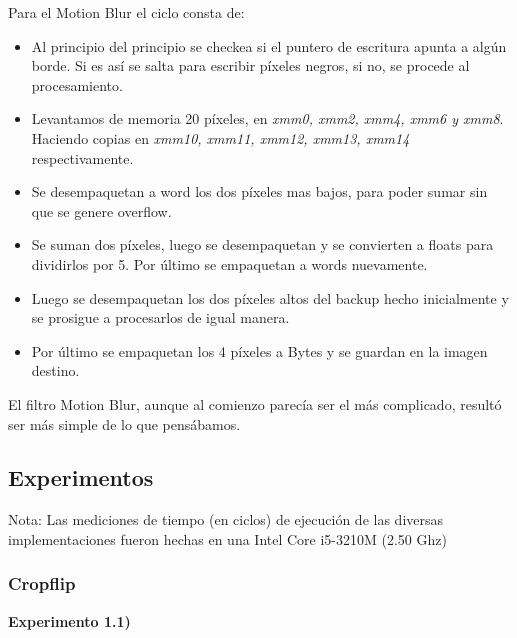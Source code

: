 \documentclass[a4paper]{article}
\begin{document}
Para el Motion Blur el ciclo consta de:
\begin{itemize}
\item Al principio del principio se checkea si el puntero de escritura apunta a alg\'{u}n borde. Si es as\'{i} se salta para escribir p\'{i}xeles negros, si no, se procede al procesamiento. \\
\item Levantamos de memoria 20 p\'{i}xeles, en \textit{xmm0, xmm2, xmm4, xmm6 y xmm8}. Haciendo copias en \textit{xmm10, xmm11, xmm12, xmm13, xmm14} respectivamente. \\
\item Se desempaquetan a word los dos p\'{i}xeles mas bajos, para poder sumar sin que se genere overflow. \\
\item Se suman dos p\'{i}xeles, luego se desempaquetan y se convierten a floats para dividirlos por 5. Por \'{u}ltimo se empaquetan a words nuevamente. \\
\item Luego se desempaquetan los dos p\'{i}xeles altos del backup hecho inicialmente y se prosigue a procesarlos de igual manera. \\
\item Por \'{u}ltimo se empaquetan los 4 p\'{i}xeles a Bytes y se guardan en la imagen destino.
\end{itemize}

El filtro Motion Blur, aunque al comienzo parecía ser el más complicado, resultó ser más simple de lo que pensábamos.

\newpage

\subsection{Experimentos}

Nota: Las mediciones de tiempo (en ciclos) de ejecuci\'{o}n de las diversas implementaciones fueron hechas en una Intel Core i5-3210M (2.50 Ghz)

\subsubsection{Cropflip}

\textbf{Experimento 1.1)}\\
\end{document}

